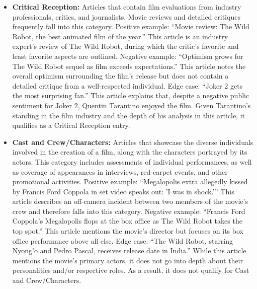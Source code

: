 \documentclass[letterpaper]{article} %
\begin{document}
\begin{itemize}
    \item \textbf{Critical Reception:}  
    Articles that contain film evaluations from industry professionals, critics, and journalists. Movie reviews and detailed critiques frequently fall into this category.  
    Positive example: “Movie review: The Wild Robot, the best animated film of the year.” This article is an industry expert’s review of The Wild Robot, during which the critic’s favorite and least favorite aspects are outlined.  
    Negative example: “Optimism grows for The Wild Robot sequel as film exceeds expectations.” This article notes the overall optimism surrounding the film’s release but does not contain a detailed critique from a well-respected individual.  
    Edge case: “Joker 2 gets the most surprising fan.” This article explains that, despite a negative public sentiment for Joker 2, Quentin Tarantino enjoyed the film. Given Tarantino’s standing in the film industry and the depth of his analysis in this article, it qualifies as a Critical Reception entry.  

    \item \textbf{Cast and Crew/Characters:}  
    Articles that showcase the diverse individuals involved in the creation of a film, along with the characters portrayed by its actors. This category includes assessments of individual performances, as well as coverage of appearances in interviews, red-carpet events, and other promotional activities.  
    Positive example: “Megalopolis extra allegedly kissed by Francis Ford Coppola in set video speaks out: 'I was in shock.'” This article describes an off-camera incident between two members of the movie’s crew and therefore falls into this category.  
    Negative example: “Francis Ford Coppola’s Megalopolis flops at the box office as The Wild Robot takes the top spot.” This article mentions the movie’s director but focuses on its box office performance above all else.  
    Edge case: “The Wild Robot, starring Nyong’o and Pedro Pascal, receives release date in India.” While this article mentions the movie’s primary actors, it does not go into depth about their personalities and/or respective roles. As a result, it does not qualify for Cast and Crew/Characters.  


\end{itemize}
\end{document}

